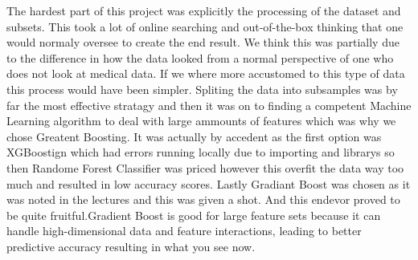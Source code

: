 \documentclass{article}
\begin{document}
The hardest part of this project was explicitly the processing of the dataset and subsets. This took a lot of online searching and out-of-the-box thinking that one would normaly oversee to create the end result. We think this was partially due to the difference in how the data looked from a normal perspective of one who does not look at medical data. If we where more accustomed to this type of data this process would have been simpler. Spliting the data into subsamples was by far the most effective stratagy and then it was on to finding a competent Machine Learning algorithm to deal with large ammounts of features which was why we chose Greatent Boosting. It was actually by accedent as the first option was XGBoostign which had errors running locally due to importing and librarys so then Randome Forest Classifier was priced however this overfit the data way too much and resulted in low accuracy scores. Lastly Gradiant Boost was chosen as it was noted in the lectures and this was given a shot. And this endevor proved to be quite fruitful.Gradient Boost is good for large feature sets because it can handle high-dimensional data and feature interactions, leading to better predictive accuracy resulting in what you see now. 
\end{document}

